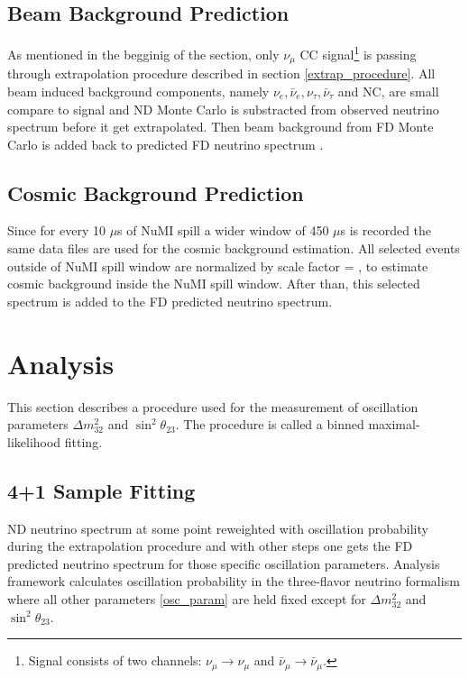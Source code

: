 \subsection{Beam Background Prediction}
As mentioned in the begginig of the section, only $\nu_\mu$ CC signal\footnote{Signal consists of two
channels: $\nu_\mu \rightarrow \nu_\mu$ and $\bar\nu_\mu \rightarrow \bar\nu_\mu$.} is passing 
through extrapolation procedure described in section \ref{extrap_procedure}. All beam induced 
background components, namely $\nu_e, \bar\nu_e, \nu_\tau, \bar\nu_\tau$ and NC, are small compare 
to signal and ND Monte Carlo is substracted from observed neutrino spectrum before it get extrapolated.
Then beam background from FD Monte Carlo is added back to predicted FD neutrino spectrum \cite{extrap_technote}. 

\subsection{Cosmic Background Prediction}
Since for every 10 $\mu$s of NuMI spill a wider window of 450 $\mu$s is recorded the same data files
are used for the cosmic background estimation. All selected events outside of NuMI spill window are 
normalized by scale factor 
\be
{} = ,
\ee
to estimate cosmic background inside the NuMI spill window. After than, this selected spectrum is added 
to the FD predicted neutrino spectrum.

\section{Analysis}
This section describes a procedure used for the measurement of oscillation parameters $\Delta m^2_{32}$ 
and $\sin^2\theta_{23}$. The procedure is called a binned maximal-likelihood fitting.

\subsection{4+1 Sample Fitting}
ND neutrino spectrum at some point reweighted with oscillation probability during the extrapolation procedure 
and with other steps one gets the FD predicted neutrino spectrum for those specific oscillation parameters. 
Analysis framework calculates oscillation probability in the three-flavor neutrino formalism where all other
parameters \ref{osc_param} are held fixed except for $\Delta m^2_{32}$ and $\sin^2\theta_{23}$. 

